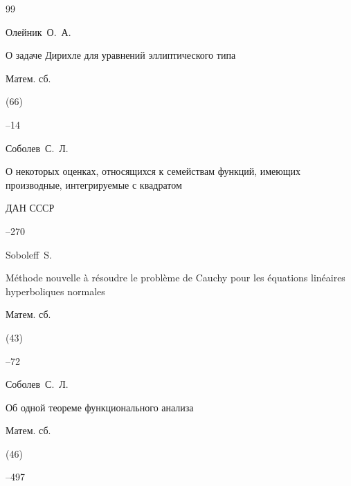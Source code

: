 \begin{thebibliography}{99}

\by Олейник~О.~А.

\paper О задаче Дирихле для уравнений эллиптического типа

\jour Матем. сб.


(66)


--14







\by Соболев~С.~Л.

\paper О некоторых оценках, относящихся к семействам функций, имеющих производные, интегрируемые с квадратом

\jour ДАН СССР



--270






\by Soboleff~S.

\paper M\'ethode nouvelle \`a r\'esoudre le probl\`eme de Cauchy pour les \'equations lin\'eaires hyperboliques normales

\jour Матем. сб.


(43)


--72






\by Соболев~С.~Л.

\paper Об одной теореме функционального анализа

\jour Матем. сб.


(46)


--497


\end{thebibliography}
